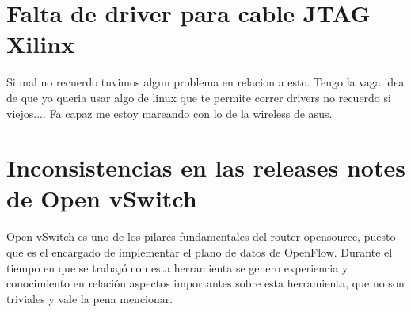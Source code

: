 \section{Falta de driver para cable JTAG Xilinx}
Si mal no recuerdo tuvimos algun problema en relacion a esto. Tengo la vaga idea de que yo queria usar algo de linux que te permite correr drivers no recuerdo si viejos.... Fa capaz me estoy mareando con lo de la wireless de asus.

\section{Inconsistencias en las releases notes de Open vSwitch}

Open vSwitch es uno de los pilares fundamentales del router opensource, puesto que es el encargado de implementar el plano de datos de OpenFlow. Durante el tiempo en que se trabaj\'o con esta herramienta se genero experiencia y conocimiento en relaci\'on aspectos importantes sobre esta herramienta, que no son triviales y vale la pena mencionar.\\ 

